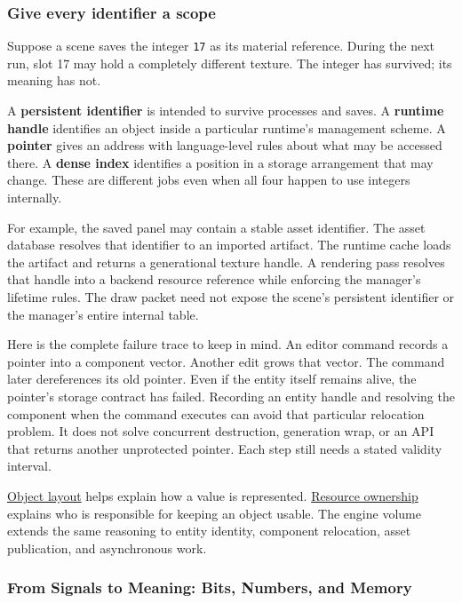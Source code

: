 \subsubsection{Give every identifier a scope}\label{05-engine-i-ch001-give-every-identifier-a-scope}

Suppose a scene saves the integer \texttt{17} as its material reference. During the next run, slot 17 may hold a completely different texture. The integer has survived; its meaning has not.

A \textbf{persistent identifier} is intended to survive processes and saves. A \textbf{runtime handle} identifies an object inside a particular runtime's management scheme. A \textbf{pointer} gives an address with language-level rules about what may be accessed there. A \textbf{dense index} identifies a position in a storage arrangement that may change. These are different jobs even when all four happen to use integers internally.

For example, the saved panel may contain a stable asset identifier. The asset database resolves that identifier to an imported artifact. The runtime cache loads the artifact and returns a generational texture handle. A rendering pass resolves that handle into a backend resource reference while enforcing the manager's lifetime rules. The draw packet need not expose the scene's persistent identifier or the manager's entire internal table.

Here is the complete failure trace to keep in mind. An editor command records a pointer into a component vector. Another edit grows that vector. The command later dereferences its old pointer. Even if the entity itself remains alive, the pointer's storage contract has failed. Recording an entity handle and resolving the component when the command executes can avoid that particular relocation problem. It does not solve concurrent destruction, generation wrap, or an API that returns another unprotected pointer. Each step still needs a stated validity interval.

\hyperref[appendix-c4ac6bb0fff8]{Object layout} helps explain how a value is represented. \hyperref[appendix-69739d3ab49b]{Resource ownership} explains who is responsible for keeping an object usable. The engine volume extends the same reasoning to entity identity, component relocation, asset publication, and asynchronous work.

\subsubsection{From Signals to Meaning: Bits, Numbers, and Memory}\label{05-engine-i-ch001-from-signals-to-meaning-bits-numbers-and-memory}

